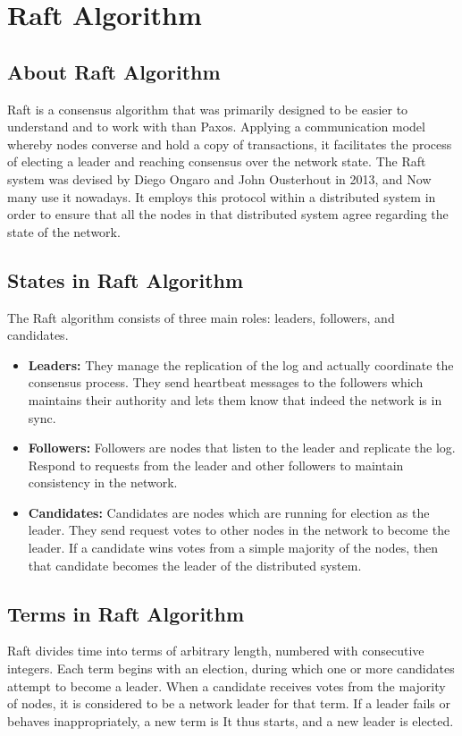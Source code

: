 \chapter{Raft Algorithm}
\section{About Raft Algorithm}
\hspace{10mm} Raft is a consensus algorithm that was primarily designed to be easier
to understand and to work with than Paxos. Applying a communication model
whereby nodes converse and hold a copy of transactions, it facilitates the process
of electing a leader and reaching consensus over the network state. The Raft
system was devised by Diego Ongaro and John Ousterhout in 2013, and Now many use
it nowadays. It employs this protocol within a distributed system in order to
ensure that all the nodes in that distributed system agree regarding the state
of the network.
\newline

\section{States in Raft Algorithm}
The Raft algorithm consists of three main roles: leaders, followers, and candidates.
\begin{itemize}
    \item \textbf{Leaders:} They manage the replication of the log and actually
        coordinate the consensus process. They send heartbeat messages to the followers
        which maintains their authority and lets them know that indeed the network
        is in sync.

    \item \textbf{Followers:} Followers are nodes that listen to the leader and
        replicate the log. Respond to requests from the leader and other followers
        to maintain consistency in the network.

    \item \textbf{Candidates:} Candidates are nodes which are running for
        election as the leader. They send request votes to other nodes in the network
        to become the leader. If a candidate wins votes from a simple majority
        of the nodes, then that candidate becomes the leader of the distributed system.
\end{itemize}

\section{Terms in Raft Algorithm}
Raft divides time into terms of arbitrary length, numbered with consecutive
integers. Each term begins with an election, during which one or more candidates
attempt to become a leader. When a candidate receives votes from the majority of
nodes, it is considered to be a network leader for that term. If a leader fails or
behaves inappropriately, a new term is It thus starts, and a new leader is elected.
\newline

